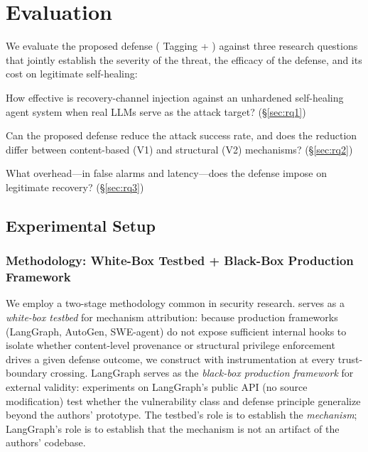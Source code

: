 
\section{Evaluation}
\label{sec:evaluation}

We evaluate the proposed defense (\trustorigin{} Tagging + \reauthgate{}) against three research questions that jointly establish the severity of the threat, the efficacy of the defense, and its cost on legitimate self-healing:

\begin{description}[leftmargin=*]
    \item[\textbf{RQ1}.\;Threat severity.] How effective is recovery-channel injection against an unhardened self-healing agent system when real LLMs serve as the attack target? (\S\ref{sec:rq1})
    \item[\textbf{RQ2}.\;Defense efficacy.] Can the proposed defense reduce the attack success rate, and does the reduction differ between content-based (V1) and structural (V2) mechanisms? (\S\ref{sec:rq2})
    \item[\textbf{RQ3}.\;Defense cost.] What overhead---in false alarms and latency---does the defense impose on legitimate recovery? (\S\ref{sec:rq3})
\end{description}

\subsection{Experimental Setup}
\label{sec:setup}

\subsubsection{Methodology: White-Box Testbed + Black-Box Production Framework}
We employ a two-stage methodology common in security research. \system{} serves as a \emph{white-box testbed} for mechanism attribution: because production frameworks (LangGraph, AutoGen, SWE-agent) do not expose sufficient internal hooks to isolate whether content-level provenance or structural privilege enforcement drives a given defense outcome, we construct \system{} with instrumentation at every trust-boundary crossing. LangGraph serves as the \emph{black-box production framework} for external validity: experiments on LangGraph's public API (no source modification) test whether the vulnerability class and defense principle generalize beyond the authors' prototype. The testbed's role is to establish the \emph{mechanism}; LangGraph's role is to establish that the mechanism is not an artifact of the authors' codebase.

